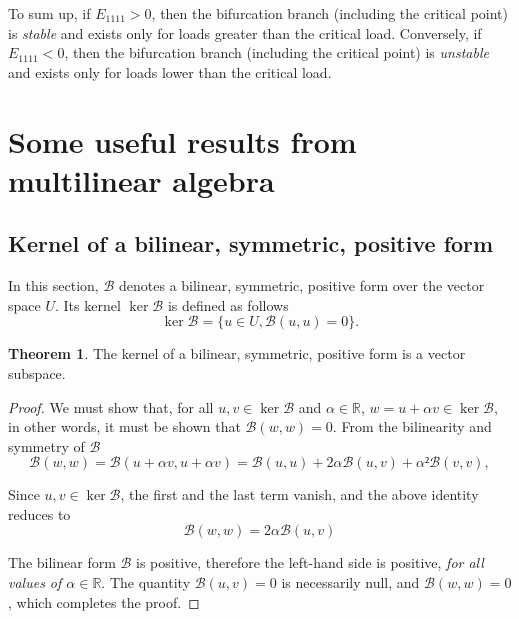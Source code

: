 \documentclass[12pt, final]{scrartcl}
\theoremstyle{definition}
\newtheorem{theorem}{Theorem}
\newcommand{\reals}{\mathbb{R}}
\begin{document}
To sum up, if $E_{1111} > 0$, then the bifurcation branch (including the
critical point) is \emph{stable} and exists only for loads greater than the
critical load. Conversely, if $E_{1111} < 0$, then the bifurcation branch
(including the critical point) is \emph{unstable} and exists only for loads
lower than the critical load.

\appendix

\section{Some useful results from multilinear algebra}

\subsection{Kernel of a bilinear, symmetric, positive form}

In this section, $\mathcal{B}$ denotes a bilinear, symmetric, positive form
over the vector space $U$. Its kernel $\ker \mathcal{B}$ is defined as
follows
\begin{equation}
 \ker \mathcal{B}= \bigl\{ u ∈ U, \mathcal{B}(u, u) = 0 \bigr\} .
\end{equation}

\begin{theorem}
  The kernel of a bilinear, symmetric, positive form is a vector subspace.
\end{theorem}
\begin{proof}
  We must show that, for all $u, v ∈\ker \mathcal{B}$ and $α ∈ \reals$,
  $w = u + α v ∈ \ker \mathcal{B}$, in other words, it must be shown that
  $\mathcal{B}(w, w) = 0$. From the bilinearity and symmetry of
  $\mathcal{B}$
 \begin{equation*}
   \mathcal{B}(w, w) = \mathcal{B}(u + α v, u + α v)
   = \mathcal{B}(u, u) + 2 α \mathcal{B}(u, v) + α² \mathcal{B}(v, v),
 \end{equation*}

 Since $u, v ∈ \ker\mathcal{B}$, the first and the last term vanish, and the above identity reduces to
 \begin{equation*}
   \mathcal{B}(w, w) = 2α \mathcal{B}(u, v)
 \end{equation*}

 The bilinear form $\mathcal{B}$ is positive, therefore the left-hand side is
 positive, \emph{for all values of $α ∈ \reals$}. The quantity
 $\mathcal{B}(u, v) = 0$ is necessarily null, and $\mathcal{B}(w, w) = 0$,
 which completes the proof.
\end{proof}
\end{document}
